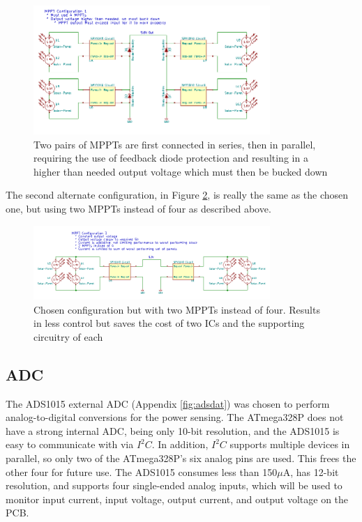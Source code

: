 \documentclass{article}
\numberwithin{figure}{section}
\numberwithin{equation}{section}
\begin{document}
{\begin{figure}[H]
  \centering
  \includegraphics[width=0.8\textwidth]{MPPTConfig1}
  \caption{Two pairs of MPPTs are first connected in series, then in parallel, requiring the use of feedback diode protection and resulting in a higher than needed output voltage which must then be bucked down}
  \label{fig:mppt_config1}
\end{figure}

The second alternate configuration, in Figure \ref{fig:mppt_config3}, is really the same as the chosen one, but using two MPPTs instead of four as described above.

\begin{figure}[H]
  \centering
  \includegraphics[width=0.8\textwidth]{MPPTConfig3}
  \caption{Chosen configuration but with two MPPTs instead of four. Results in less control but saves the cost of two ICs and the supporting circuitry of each}
  \label{fig:mppt_config3}
\end{figure}

\subsection{ADC} \label{sect:adc_just}
The ADS1015 external ADC (Appendix \ref{fig:adsdat}) was chosen to perform analog-to-digital conversions for the power sensing. The ATmega328P does not have a strong internal ADC, being only 10-bit resolution, and the ADS1015 is easy to communicate with via $I^2 C$. In addition, $I^2 C$ supports multiple devices in parallel, so only two of the ATmega328P's six analog pins are used. This frees the other four for future use. The ADS1015 consumes less than 150$\mu$A, has 12-bit resolution, and supports four single-ended analog inputs, which will be used to monitor input current, input voltage, output current, and output voltage on the PCB.

}
\end{document}
